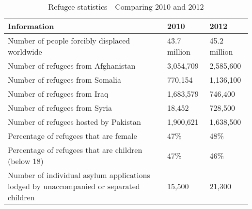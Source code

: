 \begin{center}
\begin{table}[!ht]
\caption{\label{tab:refugeestatistics}Refugee statistics - Comparing 2010 and 2012 \cite{UNHCRstat2010,UNHCRstat2012}}
    \begin{tabular}{ | p{8cm} | l | l |}
    \hline
    \textbf{Information} & \textbf{2010} & \textbf{2012} \\ 
    \hline
    Number of people forcibly displaced worldwide & 43.7 million & 45.2 million  \\ 
    \hline
    Number of refugees from Afghanistan & 3,054,709 & 2,585,600 \\ 
    \hline
    Number of refugees from Somalia & 770,154 & 1,136,100 \\ 
    \hline
    Number of refugees from Iraq & 1,683,579 & 746,400 \\ 
    \hline
     Number of refugees from Syria & 18,452 & 728,500 \\ 
    \hline
    Number of refugees hosted by Pakistan & 1,900,621 & 1,638,500 \\
    \hline
    Percentage of refugees that are female & 47\% & 48\% \\
	\hline
	Percentage of refugees that are children (below 18) & 47\% & 46\% \\
	\hline
	Number of individual asylum applications lodged by unaccompanied or separated children & 15,500 & 21,300 \\
	\hline
    \end{tabular}
   \end{table}
\end{center}


